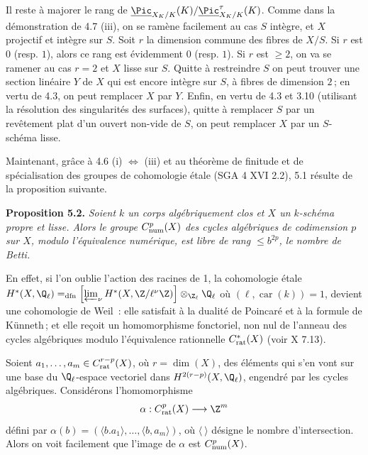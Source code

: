 Il reste \`a majorer le rang de \(\underline{\Pic}_{X_K/K}(K)/\underline{\Pic}^\tau_{X_K/K}(K)\). Comme dans la d\'emonstration de 4.7 (iii), on se ram\`ene facilement au cas \(S\) int\`egre, et \(X\) projectif et int\`egre sur \(S\). Soit \(r\) la dimension commune des fibres de \(X/S\). Si \(r\) est \(0\) (resp. \(1\)), alors ce rang est \'evidemment \(0\) (resp. \(1\)). Si \(r\) est \(\ge2\), on va se ramener au cas \(r=2\) et \(X\) lisse sur \(S\). Quitte \`a restreindre \(S\) on peut trouver une section lin\'eaire \(Y\) de \(X\) qui est
encore int\`egre sur \(S\), \`a fibres de dimension \(2\)\,; en vertu de 4.3, on peut remplacer \(X\) par \(Y\). Enfin, en vertu de 4.3 et 3.10 (utilisant la r\'esolution des singularit\'es des surfaces), quitte \`a remplacer \(S\) par un rev\^etement plat d'un ouvert non-vide de \(S\), on peut remplacer \(X\) par un \(S\)-sch\'ema lisse.

Maintenant, gr\^ace \`a 4.6 (i) \(\Longleftrightarrow\) (iii) et au th\'eor\`eme de finitude et de sp\'ecialisation des groupes de cohomologie \'etale (SGA 4 XVI 2.2), 5.1 r\'esulte de la proposition suivante.

\textbf{Proposition 5.2.} \emph{Soient \(k\) un corps alg\'ebriquement clos et \(X\) un \(k\)-sch\'ema propre et lisse. Alors le groupe \(C^p_{\rm num}(X)\) des cycles alg\'ebriques de codimension \(p\) sur \(X\), modulo l'\'equivalence num\'erique, est libre de rang \(\le b^{2p}\), le nombre de Betti.}

En effet, si l'on oublie l'action des racines de 1, la cohomologie \'etale \(H^*(X,\Q_\ell)=_{\rm dfn}\left[\varprojlim_\nu H^*(X,\Z/\ell^\nu\Z)\right]\otimes_{\Z_\ell}\Q_\ell\) o\`u \((\ell,\operatorname{car}(k))=1\), devient une cohomologie de Weil~: elle satisfait \`a la dualit\'e de Poincar\'e et \`a la formule de K\"unneth\,; et elle re\c{c}oit un homomorphisme fonctoriel, non nul de l'anneau des cycles alg\'ebriques modulo l'\'equivalence rationnelle \(C^*_{\rm rat}(X)\) (voir X 7.13).

Soient \(a_1,\ldots,a_m\in C^{r-p}_{\rm rat}(X)\), o\`u \(r=\dim(X)\), des \'el\'ements qui s'en vont sur une base du \(\Q_\ell\)-espace vectoriel dans \(H^{2(r-p)}(X,\Q_\ell)\), engendr\'e par les cycles alg\'ebriques. Consid\'erons l'homomorphisme
\[
   \alpha:C^p_{\rm rat}(X)\longrightarrow \Z^m
\]
d\'efini par \(\alpha(b)=(\langle b.a_1\rangle,\ldots,\langle b,a_m\rangle)\), o\`u \(\langle\ \rangle\) d\'esigne le nombre d'intersection. Alors on voit facilement que l'image de \(\alpha\) est \(C^p_{\rm num}(X)\).

